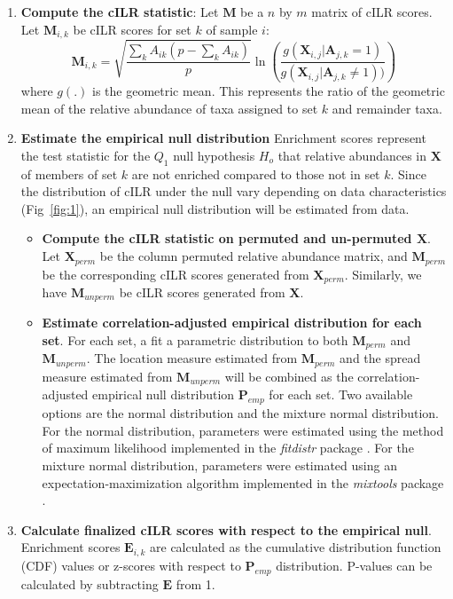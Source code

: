 \documentclass[10pt,letterpaper]{article}
\begin{document}
\begin{enumerate}
    \item \textbf{Compute the cILR statistic}: Let $\mathbf{M}$ be a $n$ by $m$ matrix of cILR scores. Let $\mathbf{M}_{i,k}$ be cILR scores for set $k$ of sample $i$:   
    \begin{equation}\label{main_eq}
        \mathbf{M}_{i,k} = \sqrt{\frac{\sum_k A_{ik}(p - \sum_k A_{ik})}{p}} \ln \left( \frac{g(\mathbf{X}_{i,j}|\mathbf{A}_{j,k} = 1)}{g(\mathbf{X}_{i,j}|\mathbf{A}_{j,k} \neq 1))} \right)
    \end{equation}
    where $g(.)$ is the geometric mean. This represents the ratio of the geometric mean of the relative abundance of taxa assigned to set $k$ and remainder taxa. 
    \item \textbf{Estimate the empirical null distribution} Enrichment scores represent the test statistic for the $Q_1$ null hypothesis $H_o$ that relative abundances in $\mathbf{X}$ of members of set $k$ are not enriched compared to those not in set $k$. Since the distribution of cILR under the null vary depending on data characteristics (Fig~\ref{fig:1}), an empirical null distribution will be estimated from data.
    \begin{itemize}
        \item \textbf{Compute the cILR statistic on permuted and un-permuted $\mathbf{X}$}.  Let $\mathbf{X}_{perm}$ be the column permuted relative abundance matrix, and $\mathbf{M}_{perm}$ be the corresponding cILR scores generated from $\mathbf{X}_{perm}$. Similarly, we have $\mathbf{M}_{unperm}$ be cILR scores generated from $\mathbf{X}$.
        \item \textbf{Estimate correlation-adjusted empirical distribution for each set}. For each set, a fit a parametric distribution to both $\mathbf{M}_{perm}$ and $\mathbf{M}_{unperm}$. The location measure estimated from $\mathbf{M}_{perm}$ and the spread measure estimated from $\mathbf{M}_{unperm}$ will be combined as the correlation-adjusted empirical null distribution $\mathbf{P}_{emp}$ for each set. Two available options are the normal distribution and the mixture normal distribution. For the normal distribution, parameters were estimated using the method of maximum likelihood implemented in the \emph{fitdistr} package \cite{delignette-muller2015}. For the mixture normal distribution, parameters were estimated using an expectation-maximization algorithm implemented in the \emph{mixtools} package \cite{benaglia2009}. 
    \end{itemize}
    \item \textbf{Calculate finalized cILR scores with respect to the empirical null}. Enrichment scores $\mathbf{E}_{i,k}$ are calculated as the cumulative distribution function (CDF) values or z-scores with respect to $\mathbf{P}_{emp}$ distribution. P-values can be calculated by subtracting $\mathbf{E}$ from 1. 
\end{enumerate}
\end{document}
